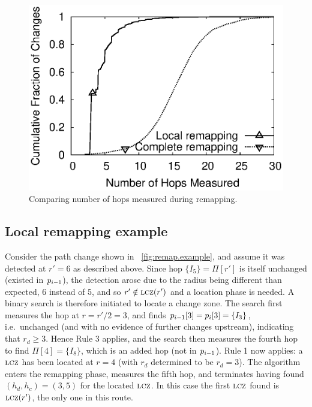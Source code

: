 \begin{figure}
\begin{minipage}{0.32\textwidth}
\includegraphics[width=1.05\textwidth]{figs/costhop.eps}
\caption{Comparing number of hops measured during remapping.}
\label{fig:sim.abs.cmp.hops}
\end{minipage}
\end{figure}


\subsection{Local remapping example}

Consider the path change shown in \figstr~\ref{fig:remap.example}, and
assume it was detected at $r'=6$ as described above.  Since hop $\{I_5\}
=\Pi[r']$ is itself unchanged (existed in $p_{i-1}$), the detection arose
due to the radius being different than expected, 6 instead of 5, and so
$r' \notin \mathrm{\textsc{lcz}}(r')$ and a location phase is needed.  A binary search is
therefore initiated to locate a change zone.  The search first measures
the hop at $r=r'/2=3$, and finds $p_{i-1}[3] = p_i[3] = \{I_3\}$,
i.e.~unchanged (and with no evidence of further changes upstream),
indicating that $r_d\ge3$.  Hence Rule 3 applies, and the search then measures
the fourth hop to find $\Pi[4] =\{I_8\}$, which is an added hop (not
in $p_{i-1}$).  Rule 1 now applies:  a $\mathrm{\textsc{lcz}}$ has been located at $r=4$
(with $r_d$ determined to be $r_d=3$).  The algorithm enters the
remapping phase, measures the fifth hop, and terminates having found
$(h_d,h_c)=(3,5)$ for the located $\mathrm{\textsc{lcz}}$.  In this case the first $\mathrm{\textsc{lcz}}$
found is $\mathrm{\textsc{lcz}}(r')$, the only one in this route.

